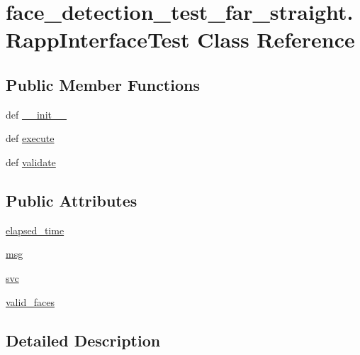 \hypertarget{classface__detection__test__far__straight_1_1RappInterfaceTest}{\section{face\-\_\-detection\-\_\-test\-\_\-far\-\_\-straight.\-Rapp\-Interface\-Test Class Reference}
\label{classface__detection__test__far__straight_1_1RappInterfaceTest}
}
\subsection*{Public Member Functions}
\begin{DoxyCompactItemize}
\item 
def \hyperlink{classface__detection__test__far__straight_1_1RappInterfaceTest_adc16596e7b264d2bfc595c8f3a32c110}{\-\_\-\-\_\-init\-\_\-\-\_\-}
\item 
def \hyperlink{classface__detection__test__far__straight_1_1RappInterfaceTest_a87ac5042ca5df7bcaeda43b64537f229}{execute}
\item 
def \hyperlink{classface__detection__test__far__straight_1_1RappInterfaceTest_ab07e72663517ec5f3314551481d80f3e}{validate}
\end{DoxyCompactItemize}
\subsection*{Public Attributes}
\begin{DoxyCompactItemize}
\item 
\hyperlink{classface__detection__test__far__straight_1_1RappInterfaceTest_a332faf8acd2e7dd48af88718dff06cea}{elapsed\-\_\-time}
\item 
\hyperlink{classface__detection__test__far__straight_1_1RappInterfaceTest_af94b85f973ae379d01ba0ecf9fa3113a}{msg}
\item 
\hyperlink{classface__detection__test__far__straight_1_1RappInterfaceTest_a056cb00672cae20c519819343e32f77c}{svc}
\item 
\hyperlink{classface__detection__test__far__straight_1_1RappInterfaceTest_a5d1d6a84a96556e5f36d47b283174aba}{valid\-\_\-faces}
\end{DoxyCompactItemize}


\subsection{Detailed Description}


